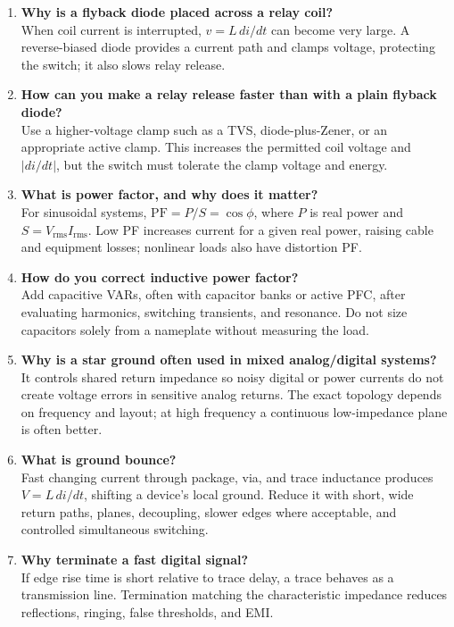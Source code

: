 \documentclass[11pt]{article}
\begin{document}
\begin{enumerate}
\item \textbf{Why is a flyback diode placed across a relay coil?}\\
When coil current is interrupted, $v=L\,di/dt$ can become very large. A reverse-biased diode provides a current path and clamps voltage, protecting the switch; it also slows relay release.

\item \textbf{How can you make a relay release faster than with a plain flyback diode?}\\
Use a higher-voltage clamp such as a TVS, diode-plus-Zener, or an appropriate active clamp. This increases the permitted coil voltage and $|di/dt|$, but the switch must tolerate the clamp voltage and energy.

\item \textbf{What is power factor, and why does it matter?}\\
For sinusoidal systems, $\mathrm{PF}=P/S=\cos\phi$, where $P$ is real power and $S=V_\mathrm{rms}I_\mathrm{rms}$. Low PF increases current for a given real power, raising cable and equipment losses; nonlinear loads also have distortion PF.

\item \textbf{How do you correct inductive power factor?}\\
Add capacitive VARs, often with capacitor banks or active PFC, after evaluating harmonics, switching transients, and resonance. Do not size capacitors solely from a nameplate without measuring the load.

\item \textbf{Why is a star ground often used in mixed analog/digital systems?}\\
It controls shared return impedance so noisy digital or power currents do not create voltage errors in sensitive analog returns. The exact topology depends on frequency and layout; at high frequency a continuous low-impedance plane is often better.

\item \textbf{What is ground bounce?}\\
Fast changing current through package, via, and trace inductance produces $V=L\,di/dt$, shifting a device's local ground. Reduce it with short, wide return paths, planes, decoupling, slower edges where acceptable, and controlled simultaneous switching.

\item \textbf{Why terminate a fast digital signal?}\\
If edge rise time is short relative to trace delay, a trace behaves as a transmission line. Termination matching the characteristic impedance reduces reflections, ringing, false thresholds, and EMI.


\end{enumerate}
\end{document}
